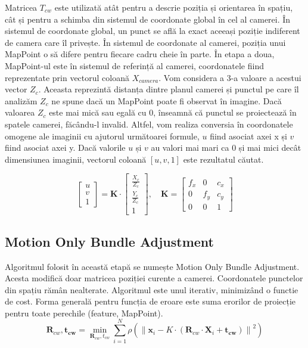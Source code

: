 \documentclass[12pt,a4paper]{report}
\begin{document}
Matricea \(T_{cw}\) este utilizată atât pentru a descrie poziția și orientarea în spațiu, 
cât și pentru a schimba din sistemul de coordonate global în cel al camerei.
În sistemul de coordonate global, un punct se află la exact aceeași poziție indiferent de 
camera care îl privește. În sistemul de coordonate al camerei, poziția unui 
MapPoint o să difere pentru fiecare cadru cheie în parte.
În etapa a doua, MapPoint-ul este în sistemul de referință al camerei, 
coordonatele fiind reprezentate prin vectorul coloană \(X_{camera}\). Vom considera 
a 3-a valoare a acestui vector \(Z_c\). Aceasta reprezintă distanța dintre planul camerei
și punctul pe care îl analizăm \(Z_c\) ne spune dacă un MapPoint poate fi observat
în imagine. Dacă valoarea \(Z_c\) este mai mică sau egală cu 0, înseamnă că punctul 
se proiectează în spatele camerei, făcându-l invalid. Altfel, vom realiza conversia
în coordonatele omogene ale imaginii cu ajutorul următoarei formule, \(u\) fiind asociat
axei x și \(v\) fiind asociat axei y. Dacă valorile \(u\) și \( v \) au valori mai mari ca 0
și mai mici decât dimensiunea imaginii, vectorul coloană \([u, v, 1]\) este rezultatul căutat. 

\begin{equation}
    \begin{bmatrix}
        u \\
        v \\
        1
        \end{bmatrix}
        =
        \mathbf{K} \cdot
        \begin{bmatrix}
        \frac{X_c}{Z_c} \\
        \frac{Y_c}{Z_c} \\
        1 
        \end{bmatrix}, \quad{}
        \mathbf{K} =
        \begin{bmatrix}
        f_x & 0 & c_x \\
        0 & f_y & c_y \\
        0 & 0 & 1
        \end{bmatrix}
\end{equation} 


\subsection{Motion Only Bundle Adjustment}
Algoritmul folosit în această etapă se numește Motion Only Bundle Adjustment\cite{bundleAdjustment}. Acesta 
modifică doar matricea poziției curente a camerei. Coordonatele punctelor din spațiu rămân nealterate. 
Algoritmul este unul iterativ, minimizând o functie de cost. Forma generală pentru funcția de eroare este suma
erorilor de proiecție pentru toate perechile (feature, MapPoint).
 \begin{equation}
    \mathbf{R}_{cw}, \mathbf{t_{cw}} = \min_{\mathbf{R}_{cw}, t_{cw}} \sum_{i=1}^{N} \rho\left( \left\| \mathbf{x}_i - K \cdot \left( \mathbf{R}_{cw} \cdot \mathbf{X}_i + \mathbf{t_{cw}} \right) \right\|^2 \right)
\end{equation}
\end{document}
